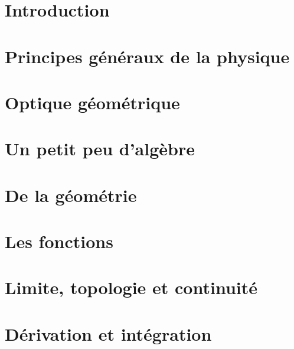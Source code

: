 




\makeindex



%



\tableofcontents

\chapter{Introduction}
	

\chapter{Principes généraux de la physique}
	
	

\chapter{Optique géométrique}
	
	
	
	
	

\chapter{Un petit peu d'algèbre}
	
	 

\chapter{De la géométrie}
	

\chapter{Les fonctions}
	

\chapter{Limite, topologie et continuité}	
	
	
	
	

\chapter{Dérivation et intégration}
	

